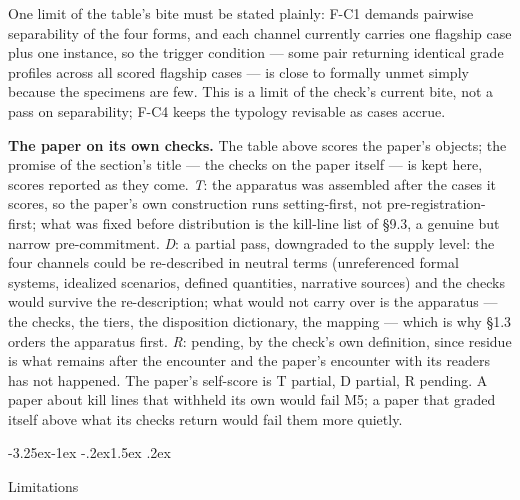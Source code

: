 \documentclass[11pt,a4paper]{article}
\makeatletter
\renewcommand\subsection{\@startsection{subsection}{2}{\z@}%
  {-3.25ex\@plus -1ex \@minus -.2ex}{1.5ex \@plus .2ex}%
  {\normalfont\large\bfseries\raggedright}}
\makeatother
\begin{document}
One limit of the table's bite must be stated plainly: F-C1 demands pairwise separability of the four forms, and each channel currently carries one flagship case plus one instance, so the trigger condition — some pair returning identical grade profiles across all scored flagship cases — is close to formally unmet simply because the specimens are few. This is a limit of the check's current bite, not a pass on separability; F-C4 keeps the typology revisable as cases accrue.

\textbf{The paper on its own checks.} The table above scores the paper's objects; the promise of the section's title — the checks on the paper itself — is kept here, scores reported as they come. \textit{T}: the apparatus was assembled after the cases it scores, so the paper's own construction runs setting-first, not pre-registration-first; what was fixed before distribution is the kill-line list of §9.3, a genuine but narrow pre-commitment. \textit{D}: a partial pass, downgraded to the supply level: the four channels could be re-described in neutral terms (unreferenced formal systems, idealized scenarios, defined quantities, narrative sources) and the checks would survive the re-description; what would not carry over is the apparatus — the checks, the tiers, the disposition dictionary, the mapping — which is why §1.3 orders the apparatus first. \textit{R}: pending, by the check's own definition, since residue is what remains after the encounter and the paper's encounter with its readers has not happened. The paper's self-score is T partial, D partial, R pending. A paper about kill lines that withheld its own would fail M5; a paper that graded itself above what its checks return would fail them more quietly.

\subsection{Limitations}
\end{document}
